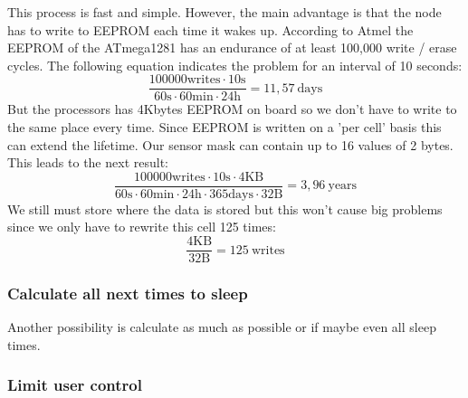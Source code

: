 This process is fast and simple. However, the main advantage is that the node has to write to EEPROM each time it wakes up. According to Atmel the EEPROM of the ATmega1281 has an endurance of at least 100,000 write / erase cycles. The following equation indicates the problem for an interval of 10 seconds:
\begin{equation}
\frac{100000 \mathrm{writes} \cdot 10 \mathrm{s}}{60 \mathrm{s} \cdot 60 \mathrm{min} \cdot 24 \mathrm{h}}= 11,57 \: \mathrm{days} 
\label{eq:1}
\end{equation}
But the processors has 4Kbytes EEPROM on board so we don't have to write to the same place every time. Since EEPROM is written on a 'per cell' basis this can extend the lifetime. Our sensor mask can contain up to 16 values of 2 bytes. This leads to the next result:
\begin{equation}
\frac{100000 \mathrm{writes} \cdot 10 \mathrm{s} \cdot 4\mathrm{KB}}{60 \mathrm{s} \cdot 60 \mathrm{min} \cdot 24 \mathrm{h} \cdot 365\mathrm{days} \cdot 32\mathrm{B}} = 3,96\: \mathrm{years}
\end{equation}
We still must store where the data is stored but this won't cause big problems since we only have to rewrite this cell 125 times:
\begin{equation}
\frac{4\mathrm{KB}}{32\mathrm{B}} = 125 \: \mathrm{writes}
\end{equation}

\subsubsection{Calculate all next times to sleep}
Another possibility is calculate as much as possible or if maybe even all sleep times. 
\subsubsection{Limit user control}

